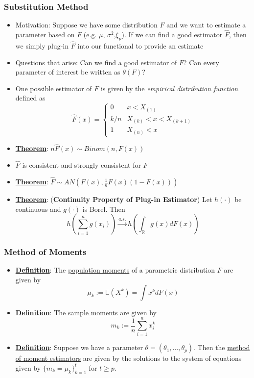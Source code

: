 \documentclass{article}
\newcommand{\R}{{\mathbb{R}}}
\newcommand{\E}{{\mathbb{E}}}
\begin{document}
\subsubsection{Substitution Method}
\begin{itemize}
\item Motivation: Suppose we have some distribution $F$ and we want to estimate a parameter based on $F$ (e.g. $\mu$, $\sigma^2$,$\xi_p$). If we can find a good estimator $\hat{F}$, then we simply plug-in $\hat{F}$ into our functional to provide an estimate
\item Questions that arise: Can we find a good estimator of $F$? Can every parameter of interest be written as $\theta(F)$?
\item One possible estimator of $F$ is given by the \textit{empirical distribution function} defined as $$\hat{F}(x) = \begin{cases}0 & x<X_{(1)}\\ k/n & X_{(k)}<x<X_{(k+1)}\\ 1 & X_{(n)}<x\end{cases}$$
\item \underline{\textbf{Theorem}}: $n\hat{F}(x)\sim Binom (n, F(x))$
\item $\hat{F}$ is consistent and strongly consistent for $F$ 
\item \underline{\textbf{Theorem}}: $\hat{F}\sim AN(F(x),\frac{1}{n}F(x)(1-F(x)))$
\item \underline{\textbf{Theorem}}: (\textbf{Continuity Property of Plug-in Estimator}) Let $h(\cdot)$ be continuous and $g(\cdot)$ is Borel. Then $$h\left(\sum_{i=1}^n g(x_i)\right) \overset{a.s.}{\longrightarrow} h\left(\int_{\R}g(x)dF(x)\right)$$
\end{itemize}

\subsubsection{Method of Moments}
\begin{itemize}
\item \underline{\textbf{Definition}}: The \underline{population moments} of a parametric distribution $F$ are given by $$\mu_k := \E(X^k) = \int x^kdF(x)$$
\item \underline{\textbf{Definition}}: The \underline{sample moments} are given by $$m_k := \frac{1}{n}\sum_{i=1}^{n}x_i^k$$
\item \underline{\textbf{Definition}}: Suppose we have a parameter $\theta = (\theta_1, \ldots, \theta_p)$. Then the \underline{method of moment estimators} are given by the solutions to the system of equations given by $\{m_k = \mu_k\}_{k=1}^{t}$ for $t\geq p$. 
\end{itemize}
\end{document}
